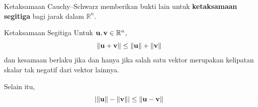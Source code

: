 Ketaksamaan Cauchy--Schwarz memberikan bukti lain untuk \textbf{ketaksamaan
segitiga} bagi
jarak dalam $\mathbb{R}^{n}$.

\begin{theorem}{Ketaksamaan Segitiga}\label{thm:triangleinequalitydotproduct}
Untuk $\mathbf{u},\mathbf{v}\in \mathbb{R}^{n}$,
\begin{equation}
\| \mathbf{u}+\mathbf{v}\| \leq \| \mathbf{u}\| +\| \mathbf{v}
\|  \label{triangleineq1}
\end{equation}
dan kesamaan berlaku jika dan hanya jika salah satu vektor merupakan kelipatan skalar tak negatif dari vektor lainnya.

Selain itu,
\begin{equation}
| \| \mathbf{u}\| -\| \mathbf{v}\| | \leq
\| \mathbf{u}-\mathbf{v}\|  \label{triangleineq2}
\end{equation}
\end{theorem}

